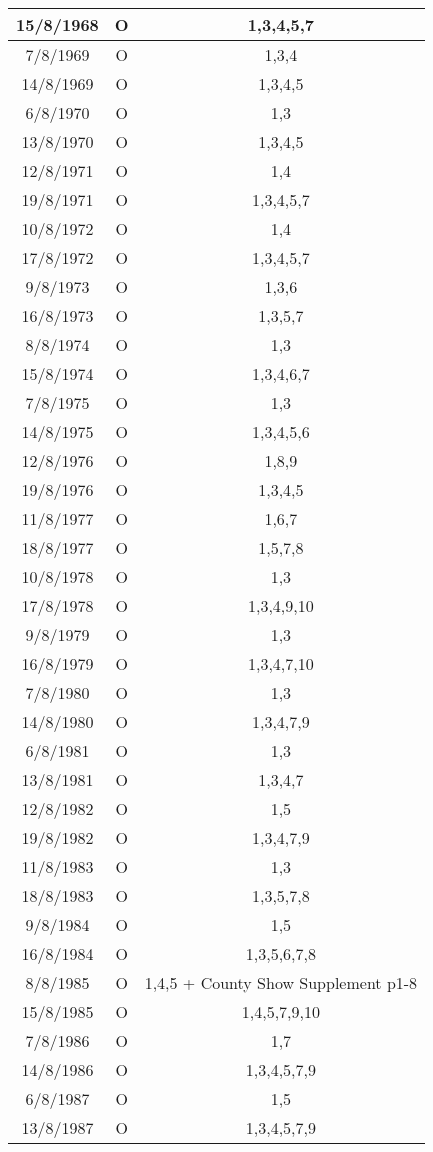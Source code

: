 \begin{longtable}{|c|c|c|c|c|c|c|c|c|c|c|c|c|c|}
\hline
	15/8/1968	 &
	O &
	\multicolumn{12}{c|}{1,3,4,5,7}
	\tabularnewline
\hline
	7/8/1969	&
	O &
	\multicolumn{12}{c|}{1,3,4}
	\tabularnewline
\hline
	14/8/1969	 &
	O &
	\multicolumn{12}{c|}{1,3,4,5}
	\tabularnewline
\hline
	6/8/1970	&
	O &
	\multicolumn{12}{c|}{1,3}
	\tabularnewline
\hline
	13/8/1970	 &
	O &
	\multicolumn{12}{c|}{1,3,4,5}
	\tabularnewline
\hline
	12/8/1971	 &
	O &
	\multicolumn{12}{c|}{1,4}
	\tabularnewline
\hline
	19/8/1971	 &
	O &
	\multicolumn{12}{c|}{1,3,4,5,7}
	\tabularnewline
\hline
	10/8/1972 &	
	O &
	\multicolumn{12}{c|}{1,4}
	\tabularnewline
\hline
	17/8/1972	 &
	O &
	\multicolumn{12}{c|}{1,3,4,5,7}
	\tabularnewline
\hline
	9/8/1973	&
	O &
	\multicolumn{12}{c|}{1,3,6}
	\tabularnewline
\hline
	16/8/1973	 &
	O &
	\multicolumn{12}{c|}{1,3,5,7}
	\tabularnewline
\hline
	8/8/1974 &
	O &	
	\multicolumn{12}{c|}{1,3}
	\tabularnewline
\hline
	15/8/1974	 &
	O &
	\multicolumn{12}{c|}{1,3,4,6,7}
	\tabularnewline
\hline
	7/8/1975	&
	O &
	\multicolumn{12}{c|}{1,3}
	\tabularnewline
\hline
	14/8/1975	 &
	O &
	\multicolumn{12}{c|}{1,3,4,5,6}
	\tabularnewline
\hline
	12/8/1976	 &
	O &
	\multicolumn{12}{c|}{1,8,9}
	\tabularnewline
\hline
	19/8/1976	 &
	O &
	\multicolumn{12}{c|}{1,3,4,5}
	\tabularnewline
\hline
	11/8/1977	 &
	O &
	\multicolumn{12}{c|}{1,6,7}
	\tabularnewline
\hline
	18/8/1977	 &
	O &
	\multicolumn{12}{c|}{1,5,7,8}
	\tabularnewline
\hline
	10/8/1978	 &
	O &
	\multicolumn{12}{c|}{1,3}
	\tabularnewline
\hline
	17/8/1978	 &
	O &
	\multicolumn{12}{c|}{1,3,4,9,10}
	\tabularnewline
\hline
	9/8/1979	&
	O &
	\multicolumn{12}{c|}{1,3}
	\tabularnewline
\hline
	16/8/1979	 &
	O &
	\multicolumn{12}{c|}{1,3,4,7,10}
	\tabularnewline
\hline
	7/8/1980	&
	O &
	\multicolumn{12}{c|}{1,3}
	\tabularnewline
\hline
	14/8/1980	 &
	O &
	\multicolumn{12}{c|}{1,3,4,7,9}
	\tabularnewline
\hline
	6/8/1981	&
	O &
	\multicolumn{12}{c|}{1,3}
	\tabularnewline
\hline
	13/8/1981	 &
	O &
	\multicolumn{12}{c|}{1,3,4,7}
	\tabularnewline
\hline
	12/8/1982 &
	O &
	\multicolumn{12}{c|}{1,5}
	\tabularnewline
\hline
	19/8/1982	 &
	O &
	\multicolumn{12}{c|}{1,3,4,7,9}
	\tabularnewline
\hline
	11/8/1983	 &
	O &
	\multicolumn{12}{c|}{1,3}
	\tabularnewline
\hline
	18/8/1983	 &
	O &
	\multicolumn{12}{c|}{1,3,5,7,8}
	\tabularnewline
\hline
	9/8/1984	&
	O &
	\multicolumn{12}{c|}{1,5}
	\tabularnewline
\hline
	16/8/1984	 &
	O &
	\multicolumn{12}{c|}{1,3,5,6,7,8}
	\tabularnewline
\hline
	8/8/1985	&
	O &
	\multicolumn{12}{c|}{1,4,5 + County Show Supplement p1-8}
	\tabularnewline
\hline
	15/8/1985	 &
	O &
	\multicolumn{12}{c|}{1,4,5,7,9,10}
	\tabularnewline
\hline
	7/8/1986	&
	O &
	\multicolumn{12}{c|}{1,7}
	\tabularnewline
\hline
	14/8/1986	 &
	O &
	\multicolumn{12}{c|}{1,3,4,5,7,9}
	\tabularnewline
\hline
	6/8/1987	&
	O &
	\multicolumn{12}{c|}{1,5}
	\tabularnewline
\hline
	13/8/1987	 &
	O &
	\multicolumn{12}{c|}{1,3,4,5,7,9}
	\tabularnewline
\hline
\end{longtable}


